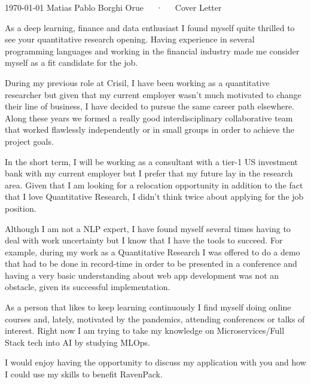 \documentclass[11pt, a4paper]{awesome-cv}
\newcommand{\myname}{Matias Pablo}
\newcommand{\mysurname}{Borghi Orue}
\newcommand{\company}{RavenPack}
\begin{document}
\makecvheader[C]

\makecvfooter
  {\today}
  {\myname {} \mysurname~~~·~~~Cover Letter}
  {}

\makelettertitle

\begin{cvletter}

As a deep learning, finance and data enthusiast I found myself quite thrilled to see your quantitative research opening. Having experience in several programming languages and working in the financial industry made me consider myself as a fit candidate for the job. 


\lettersection{Why \company?}
During my previous role at Crisil, I have been working as a quantitative researcher but given that my current employer wasn't much motivated to change their line of business, I have decided to pursue the same career path elsewhere. Along these years we formed a really good interdisciplinary collaborative team that worked flawlessly independently or in small groups in order to achieve the project goals. 

In the short term, I will be working as a consultant with a tier-1 US investment bank with my current employer but I prefer that my future lay in the research area.
Given that I am looking for a relocation opportunity in addition to the fact that I love Quantitative Research, I didn't think twice about applying for the job position.


Although I am not a NLP expert, I have found myself several times having to deal with work uncertainty but I know that I have the tools to succeed. For example, during my work as a Quantitative Research I was offered to do a demo that had to be done in record-time in order to be presented in a conference and having a very basic understanding about web app development  was not an obstacle, given its successful implementation.

As a person that likes to keep learning continuously I find myself doing online courses and, lately, motivated by the pandemics, attending conferences or talks of interest. Right now I am trying to take my knowledge on Microservices/Full Stack tech into AI by studying MLOps.

I would enjoy having the opportunity to discuss my application with you and how I could use my skills to benefit \company.


\end{cvletter}


\makeletterclosing
\end{document}

